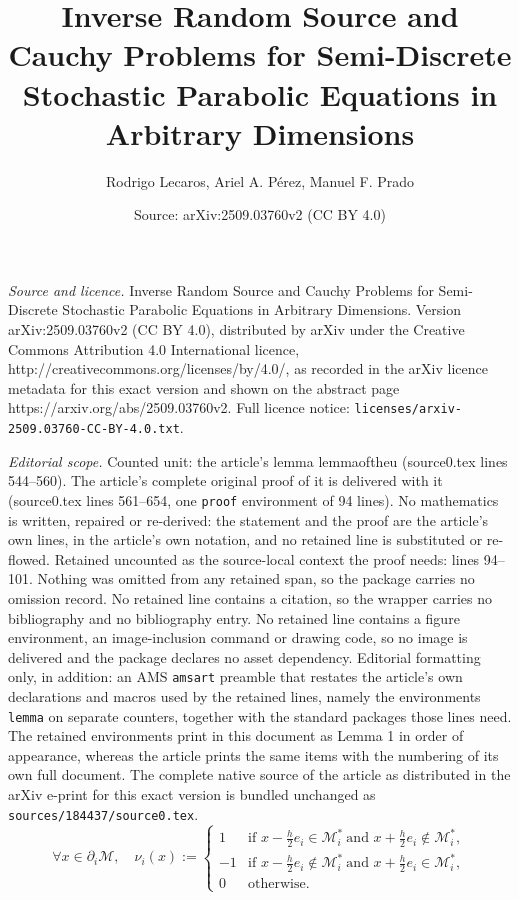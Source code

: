 \documentclass[10pt,a4paper]{amsart}
\title{Inverse Random Source and Cauchy Problems for Semi-Discrete Stochastic Parabolic Equations in Arbitrary Dimensions}
\author{Rodrigo Lecaros, Ariel A. P\'erez, Manuel F. Prado}
\date{Source: arXiv:2509.03760v2 (CC BY 4.0)}
\begin{document}
\maketitle

\noindent\emph{Source and licence.} Inverse Random Source and Cauchy Problems for Semi-Discrete Stochastic Parabolic Equations in Arbitrary Dimensions. Version arXiv:2509.03760v2 (CC BY 4.0), distributed by arXiv under the Creative Commons Attribution 4.0 International licence, http://creativecommons.org/licenses/by/4.0/, as recorded in the arXiv licence metadata for this exact version and shown on the abstract page https://arxiv.org/abs/2509.03760v2. Full licence notice: \texttt{licenses/arxiv-2509.03760-CC-BY-4.0.txt}.\par\smallskip

\noindent\textit{Editorial scope.} Counted unit: the article's lemma lemmaoftheu (source0.tex lines 544--560). The article's complete original proof of it is delivered with it (source0.tex lines 561--654, one \texttt{proof} environment of 94 lines). No mathematics is written, repaired or re-derived: the statement and the proof are the article's own lines, in the article's own notation, and no retained line is substituted or re-flowed.  Retained uncounted as the source-local context the proof needs: lines 94--101.  Nothing was omitted from any retained span, so the package carries no omission record.  No retained line contains a citation, so the wrapper carries no bibliography and no bibliography entry.  No retained line contains a figure environment, an image-inclusion command or drawing code, so no image is delivered and the package declares no asset dependency.  Editorial formatting only, in addition: an AMS \texttt{amsart} preamble that restates the article's own declarations and macros used by the retained lines, namely the environments \texttt{lemma} on separate counters, together with the standard packages those lines need.  The retained environments print in this document as Lemma 1 in order of appearance, whereas the article prints the same items with the numbering of its own full document.  The complete native source of the article as distributed in the arXiv e-print for this exact version is bundled unchanged as \texttt{sources/184437/source0.tex}.
\begin{equation}\label{normal:function}
    \forall x\in\partial_{i}\mathcal{M}, \quad
    \nu_{i}(x):=\begin{cases} 
     1 &  \mbox{if }x-\tfrac{h}{2}e_i\in \mathcal{M}_{i}^{\ast} \ \mbox{and } x+\tfrac{h}{2}e_i\notin\mathcal{M}_{i}^{\ast},\\ 
    -1 &  \mbox{if }x-\tfrac{h}{2}e_i\notin \mathcal{M}_{i}^{\ast} \ \mbox{and }x+\tfrac{h}{2}e_i\in\mathcal{M}_{i}^{\ast},\\ 
     0 &  \mbox{otherwise}.
    \end{cases}
\end{equation}
\end{document}
